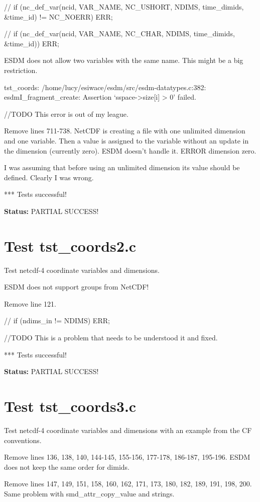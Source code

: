 //       if (nc\_def\_var(ncid, VAR\_NAME, NC\_USHORT, NDIMS, time\_dimids, \&time\_id) != NC\_NOERR) ERR;

//       if (nc\_def\_var(ncid, VAR\_NAME, NC\_CHAR, NDIMS, time\_dimids, \&time\_id)) ERR;

ESDM does not allow two variables with the same name. This might be a big restriction.

tst\_coords: /home/lucy/esiwace/esdm/src/esdm-datatypes.c:382: esdmI\_fragment\_create: Assertion `sspace->size[i] > 0' failed.

//TODO This error is out of my league.

Remove lines 711-738. NetCDF is creating a file with one unlimited dimension and one variable. Then a value is assigned to the variable without an update in the dimension (currently zero). ESDM doesn't handle it. ERROR dimension zero.

I was assuming that before using an unlimited dimension its value should be defined. Clearly I was wrong.

*** Tests successful!

{\bf \large Status: } PARTIAL SUCCESS!

\section{Test tst\_coords2.c}

Test netcdf-4 coordinate variables and dimensions.

ESDM does not support groups from NetCDF!

Remove line 121.

// if (ndims\_in != NDIMS) ERR;

//TODO This is a problem that needs to be understood it and fixed.

*** Tests successful!

{\bf \large Status: } PARTIAL SUCCESS!

\section{Test tst\_coords3.c}

Test netcdf-4 coordinate variables and dimensions with an example from the CF conventions.

Remove lines 136, 138, 140, 144-145, 155-156, 177-178, 186-187, 195-196. ESDM does not keep the same order for dimids.

Remove lines 147, 149, 151, 158, 160, 162, 171, 173, 180, 182, 189, 191, 198, 200. Same problem with smd\_attr\_copy\_value and strings.

